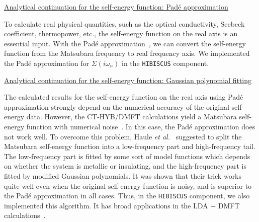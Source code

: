 \underline{Analytical continuation for the self-energy function: Pad\'{e} approximation}

To calculate real physical quantities, such as the optical conductivity, Seebeck coefficient, thermopower, etc., the self-energy function on the real axis is an essential input. With the Pad\'{e} approximation~\cite{pade}, we can convert the self-energy function from the Matsubara frequency to real frequency axis. We implemented the Pad\'{e} approximation for $\Sigma(i\omega_n)$ in the \texttt{HIBISCUS} component.

\underline{Analytical continuation for the self-energy function: Gaussian polynomial fitting}

The calculated results for the self-energy function on the real axis using Pad\'{e} approximation strongly depend on the numerical accuracy of the original self-energy data. However, the CT-HYB/DMFT calculations yield a Matsubara self-energy function with numerical noise~\cite{PhysRevB.76.205120}. In this case, the Pad\'{e} approximation does not work well. To overcome this problem, Haule \emph{et al.}~\cite{PhysRevB.81.195107} suggested to split the Matsubara self-energy function into a low-frequency part and high-frequency tail. The low-frequency part is fitted by some sort of model functions which depends on whether the system is metallic or insulating, and the high-frequency part is fitted by modified Gaussian polynomials. It was shown that their trick works quite well even when the original self-energy function is noisy, and is superior to the Pad\'{e} approximation in all cases. Thus, in the \texttt{HIBISCUS} component, we also implemented this algorithm. It has broad applications in the LDA + DMFT calculations~\cite{RevModPhys.78.865}.

